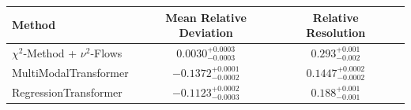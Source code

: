     \begin{tabular}{lccc}
        \toprule
        Method & Mean Relative Deviation & Relative Resolution \\
        \midrule
        $\chi^2$-Method + $\nu^2$-Flows & $0.0030_{-0.0003}^{+0.0003}$ & $0.293_{-0.002}^{+0.001}$ \\
        MultiModalTransformer & $-0.1372_{-0.0002}^{+0.0001}$ & $0.1447_{-0.0002}^{+0.0002}$ \\
        RegressionTransformer & $-0.1123_{-0.0003}^{+0.0002}$ & $0.188_{-0.001}^{+0.001}$ \\
        \bottomrule
    \end{tabular}